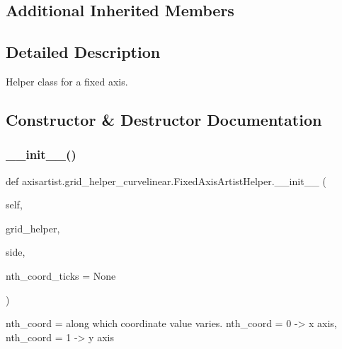 \subsection*{Additional Inherited Members}


\subsection{Detailed Description}
\begin{DoxyVerb}Helper class for a fixed axis.
\end{DoxyVerb}
 

\subsection{Constructor \& Destructor Documentation}
\mbox{\label{classaxisartist_1_1grid__helper__curvelinear_1_1FixedAxisArtistHelper_af4207225dfa7265fab5278923b2f9e6f}} 
\subsubsection{\texorpdfstring{\+\_\+\+\_\+init\+\_\+\+\_\+()}{\_\_init\_\_()}}
{\footnotesize\ttfamily def axisartist.\+grid\+\_\+helper\+\_\+curvelinear.\+Fixed\+Axis\+Artist\+Helper.\+\_\+\+\_\+init\+\_\+\+\_\+ (\begin{DoxyParamCaption}\item[{}]{self,  }\item[{}]{grid\+\_\+helper,  }\item[{}]{side,  }\item[{}]{nth\+\_\+coord\+\_\+ticks = {\ttfamily None} }\end{DoxyParamCaption})}

\begin{DoxyVerb}nth_coord = along which coordinate value varies.
 nth_coord = 0 ->  x axis, nth_coord = 1 -> y axis
\end{DoxyVerb}
 

